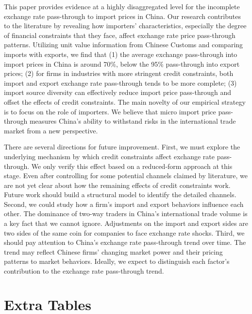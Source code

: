 \documentclass[12pt]{article}
\begin{document}
This paper provides evidence at a highly disaggregated level for the incomplete exchange rate pass-through to import prices in China. Our research contributes to the literature by revealing how importers' characteristics, especially the degree of financial constraints that they face, affect exchange rate price pass-through patterns. Utilizing unit value information from Chinese Customs and comparing imports with exports, we find that (1) the average exchange pass-through into import prices in China is around 70\%, below the 95\% pass-through into export prices; (2) for firms in industries with more stringent credit constraints, both import and export exchange rate pass-through tends to be more complete; (3) import source diversity can effectively reduce import price pass-through and offset the effects of credit constraints. The main novelty of our empirical strategy is to focus on the role of importers. We believe that micro import price pass-through measures China's ability to withstand risks in the international trade market from a new perspective.

There are several directions for future improvement. First, we must explore the underlying mechanism by which credit constraints affect exchange rate pass-through. We only verify this effect based on a reduced-form approach at this stage. Even after controlling for some potential channels claimed by literature, we are not yet clear about how the remaining effects of credit constraints work. Future work should build a structural model to identify the detailed channels. Second, we could study how a firm's import and export behaviors influence each other. The dominance of two-way traders in China's international trade volume is a key fact that we cannot ignore. Adjustments on the import and export sides are two sides of the same coin for companies to face exchange rate shocks. Third, we should pay attention to China's exchange rate pass-through trend over time. The trend may reflect Chinese firms' changing market power and their pricing patterns to market behaviors. Ideally, we expect to distinguish each factor's contribution to the exchange rate pass-through trend. 

\newpage 


\appendix

\newpage

\section{Extra Tables}\label{Appendix-Tables}
\end{document}
